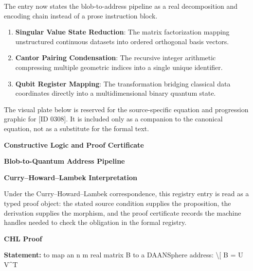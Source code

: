 The entry now states the blob-to-address pipeline as a real decomposition and encoding chain instead of a prose instruction block.
\endgroup

\begin{enumerate}[leftmargin=1.6em,itemsep=6pt,topsep=4pt]
\item \textbf{Singular Value State Reduction}: The matrix factorization mapping unstructured continuous datasets into ordered orthogonal basis vectors.
\item \textbf{Cantor Pairing Condensation}: The recursive integer arithmetic compressing multiple geometric indices into a single unique identifier.
\item \textbf{Qubit Register Mapping}: The transformation bridging classical data coordinates directly into a multidimensional binary quantum state.
\end{enumerate}

\begingroup\footnotesize\sloppy
The visual plate below is reserved for the source-specific equation and progression graphic for [ID 0308]. It is included only as a companion to the canonical equation, not as a substitute for the formal text.
\par\endgroup
\ifTZPDarkEdition
{}
\fi

\clearpage
\begingroup\tzpsupportsetup
\noindent\textbf{\fontsize{10.8pt}{12.8pt}\selectfont [ID 0308] Constructive Logic and Proof Certificate}\par
\noindent\textbf{\fontsize{10pt}{12pt}\selectfont Blob-to-Quantum Address Pipeline}\par
\vspace{0.45em}
\begingroup
\footnotesize
\setlength{\parskip}{0.22em}
\setlength{\parindent}{0pt}
\noindent\textbf{Curry--Howard--Lambek Interpretation}\par
Under the Curry--Howard--Lambek correspondence, this registry entry is read as a typed proof
object: the stated source condition supplies the proposition, the derivation supplies the
morphism, and the proof certificate records the machine handles needed to check the obligation
in the formal registry.

\vspace{0.45em}
\noindent\textbf{CHL Proof}\par
\textbf{Statement:} to map an n m real matrix B to a DAANSphere address: \textbackslash{}[ B = U V\textasciicircum{}T

